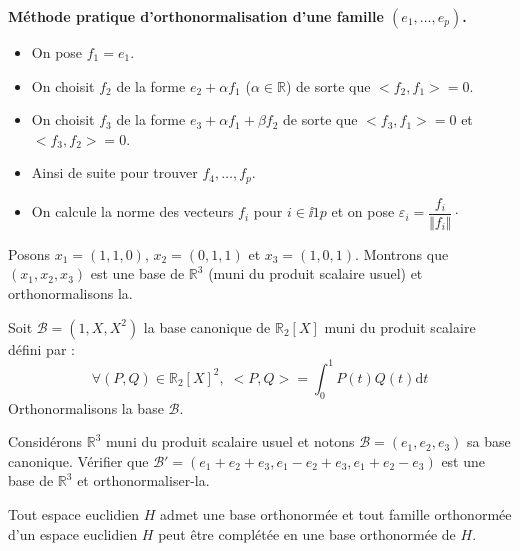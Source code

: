 \documentclass[french,11pt,twoside]{VcCours}
\newcommand{\dt}{\text{d}t}
\begin{document}
\medskip

\begin{center}
\textbf{Méthode pratique d'orthonormalisation d'une famille $(e_1, \ldots, e_p)$.}
\end{center}

\begin{itemize}
\item On pose $f_1=e_1$.
\item On choisit $f_2$ de la forme $e_2+ \alpha f_1$ ($\alpha \in \mathbb{R}$) de sorte que $<f_2, f_1>=0$.
\item On choisit $f_3$ de la forme $e_3 + \alpha f_1 + \beta f_2$ de sorte que $<f_3,f_1>=0$ et $<f_3,f_2>=0$.
\item Ainsi de suite pour trouver $f_4, \ldots, f_p$.
\item On calcule la norme des vecteurs $f_i$ pour $i \in \ii{1}{p}$ et on pose $\varepsilon_i = \dfrac{f_i}{\Vert f_i \Vert} \cdot$
\end{itemize}

\medskip

\begin{Exemple}{} Posons $x_1= (1,1,0)$, $x_2=(0,1,1)$ et $x_3=(1,0,1)$. Montrons que $(x_1,x_2,x_3)$ est une base de $\mathbb{R}^3$ (muni du produit scalaire usuel) et orthonormalisons la.

\newpage

\vspace*{5cm}
\end{Exemple}


\begin{Exemple}{} Soit $\mathcal{B}=(1,X,X^2)$ la base canonique de $\mathbb{R}_2[X]$ muni du produit scalaire défini par :
$$ \forall (P,Q) \in \mathbb{R}_2[X]^2, \; <P,Q> = \int_{0}^1 P(t) Q(t) \dt $$
Orthonormalisons la base $\mathcal{B}$.

\vspace{10cm}
\end{Exemple}

\begin{ApplicationDirecte}{} Considérons $\mathbb{R}^3$ muni du produit scalaire usuel et notons $\mathcal{B}=(e_1,e_2,e_3)$ sa base canonique. Vérifier que $\mathcal{B}'= (e_1+e_2+e_3, e_1-e_2+e_3, e_1+e_2-e_3)$ est une base de $\mathbb{R}^3$ et orthonormaliser-la.
\end{ApplicationDirecte}

\begin{Corollaire}{} Tout espace euclidien $H$ admet une base orthonormée et tout famille orthonormée d'un espace euclidien $H$ peut être complétée en une base orthonormée de $H$.
\end{Corollaire}
\end{document}
